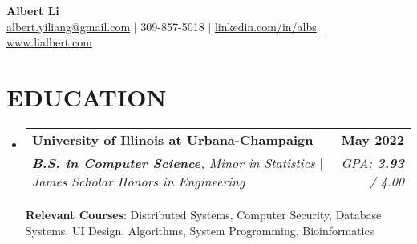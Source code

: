 \documentclass[letterpaper,10pt]{article}
\makeatletter
\newcommand{\resumeSubheading}[4]{
  \vspace{-2pt}
  \item
    \begin{tabular*}{1\textwidth}[t]{l@{\extracolsep{\fill}}r}
      \large{\textbf{#1}} & \small{\color{main}\textbf{#2}} \\
      \textit{\small#3} & \textit{\small#4} \\
    \end{tabular*}\vspace{-7pt}
}
\newcommand{\resumeSubHeadingListStart}{\begin{itemize}[leftmargin=0in, label={}]}
\newcommand{\resumeSubHeadingListEnd}{\end{itemize}}
\makeatother
\begin{document}
\begin{center}
    \textbf{\fontsize{32}{36} \textnormal{Albert Li}} \\ \vspace{8pt}
    \small{
    \href{mailto:albert.yiliang@gmail.com}{albert.yiliang@gmail.com} $|$ 309-857-5018 $|$  
    \href{https://linkedin.com/in/albs}{linkedin.com/in/albs} $|$
    \href{https://lialbert.com}{www.lialbert.com}}
\end{center}
\vspace{-20pt}
\section{EDUCATION}
  \resumeSubHeadingListStart
    \resumeSubheading
      {University of Illinois at Urbana-Champaign}{May 2022} %
      {\textnormal{\textbf{B.S. in Computer Science}, Minor in Statistics $|$ James Scholar Honors in Engineering}}
      {\textnormal{GPA: \textbf{3.93} / 4.00}}
      \vspace{6pt}
      
    \small{\textbf{Relevant Courses}{: Distributed Systems, Computer Security, Database Systems, UI Design, Algorithms, System Programming, Bioinformatics}}
    \vspace{-6pt}
  \resumeSubHeadingListEnd


\end{document}
